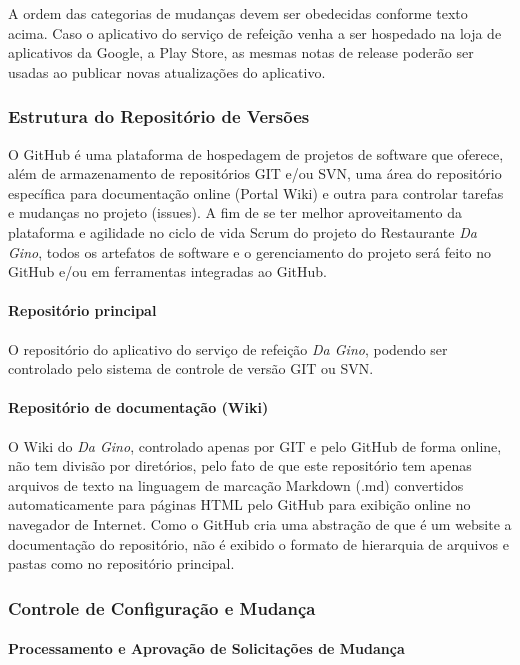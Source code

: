 A ordem das categorias de mudanças devem ser obedecidas conforme texto acima. Caso o aplicativo do serviço de refeição venha a ser hospedado na loja de aplicativos da Google, a Play Store, as mesmas notas de release poderão ser usadas ao publicar novas atualizações do aplicativo.

\subsubsection{Estrutura do Repositório de Versões}

O GitHub é uma plataforma de hospedagem de projetos de software que oferece, além de armazenamento de repositórios GIT e/ou SVN, uma área do repositório específica para documentação online (Portal Wiki) e outra para controlar tarefas e mudanças no projeto (issues). A fim de se ter melhor aproveitamento da plataforma e agilidade no ciclo de vida Scrum do projeto do Restaurante \textit{Da Gino}, todos os artefatos de software e o gerenciamento do projeto será feito no GitHub e/ou em ferramentas integradas ao GitHub.

\paragraph{Repositório principal}

O repositório do aplicativo do serviço de refeição \textit{Da Gino}, podendo ser controlado pelo sistema de controle de versão GIT ou SVN.

\paragraph{Repositório de documentação (Wiki)}

O Wiki do \textit{Da Gino}, controlado apenas por GIT e pelo GitHub de forma online, não tem divisão por diretórios, pelo fato de que este repositório tem apenas arquivos de texto na linguagem de marcação Markdown (.md) convertidos automaticamente para páginas HTML pelo GitHub para exibição online no navegador de Internet. Como o GitHub cria uma abstração de que é um website a documentação do repositório, não é exibido o formato de hierarquia de arquivos e pastas como no repositório principal.

\subsubsection{Controle de Configuração e Mudança}

\paragraph{Processamento e Aprovação de Solicitações de Mudança}

